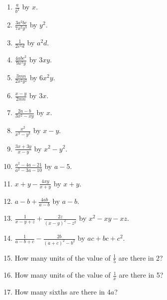 \documentclass{book}
\begin{document}
\begin{enumerate}
\item $\displaystyle \frac{a}{b^2}$ by $x$.

\item $\displaystyle \frac{3a^2bc}{7x^2y^3}$ by $y^2$.

\item $\displaystyle \frac{1}{2c^2d}$ by $a^2d$.

\item $\displaystyle \frac{4abc^2}{9x^2y}$ by $3xy$.

\item $\displaystyle \frac{3mn}{2x^2y^2}$ by $6x^2y$.

\item $\displaystyle \frac{x-y}{2mn}$ by $3x$.

\item $\displaystyle \frac{2a-b}{3x^2-xy}$ by $x$.

\item $\displaystyle \frac{x^2}{x^3-y^3}$ by $x-y$.

\item $\displaystyle \frac{3x+3y}{x-y}$ by $x^2-y^2$.

\item $\displaystyle \frac{a^2-4a-21}{a^2-3a-10}$ by $a-5$.

\item $\displaystyle x+y-\frac{4xy}{x+y}$ by $x+y$.

\item $\displaystyle a-b+\frac{4ab}{a-b}$ by $a-b$.

\item $\displaystyle \frac{1}{x-y+z}+\frac{2z}{(x-y)^2-z^2}$ by
$x^2-xy-xz$.

\item $\displaystyle \frac{1}{a-b+c}-\frac{2b}{(a+c)^2-b^2}$ by
$ac+bc+c^2$.


\item How many units of the value of $\frac{1}{5}$ are there in 2?

\item How many units of the value of $\frac{1}{x}$ are there in 5?

\item How many sixths are there in $4a$?\\
\end{enumerate}
\end{document}
